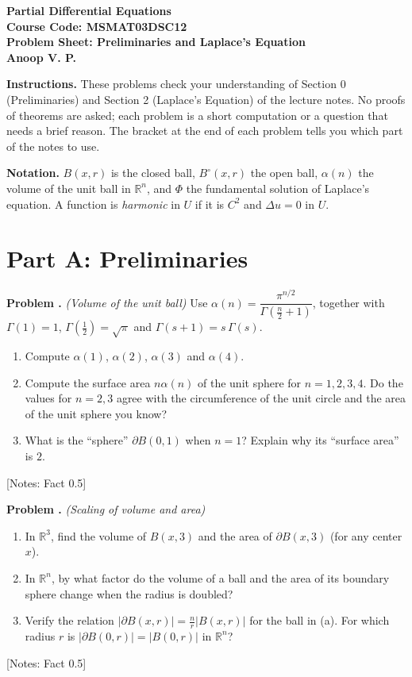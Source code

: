 \documentclass[11pt]{article}
\newcounter{prob}
\newcommand{\prob}[1]{\refstepcounter{prob}\par\medskip\noindent\textbf{Problem \theprob.} \textit{(#1)}\quad}
\newcommand{\notes}[1]{\hfill{\small[Notes: #1]}}
\begin{document}
\begin{center}
\textbf{\Large Partial Differential Equations} \\[0.5em]
\textbf{Course Code: MSMAT03DSC12} \\[0.5em]
\textbf{Problem Sheet: Preliminaries and Laplace's Equation} \\[0.5em]
\textbf{Anoop V. P.}
\end{center}

\noindent\textbf{Instructions.} These problems check your understanding of Section 0 (Preliminaries) and Section 2 (Laplace's Equation) of the lecture notes. No proofs of theorems are asked; each problem is a short computation or a question that needs a brief reason. The bracket at the end of each problem tells you which part of the notes to use.

\smallskip
\noindent\textbf{Notation.} $B(x,r)$ is the closed ball, $B^\circ(x,r)$ the open ball, $\alpha(n)$ the volume of the unit ball in $\mathbb{R}^n$, and $\Phi$ the fundamental solution of Laplace's equation. A function is \emph{harmonic} in $U$ if it is $C^2$ and $\Delta u = 0$ in $U$.

\section*{Part A: Preliminaries}

\prob{Volume of the unit ball}
Use $\alpha(n) = \dfrac{\pi^{n/2}}{\Gamma(\frac n2 + 1)}$, together with $\Gamma(1) = 1$, $\Gamma(\frac12) = \sqrt\pi$ and $\Gamma(s+1) = s\,\Gamma(s)$.
\begin{enumerate}[label=(\alph*)]
    \item Compute $\alpha(1)$, $\alpha(2)$, $\alpha(3)$ and $\alpha(4)$.
    \item Compute the surface area $n\alpha(n)$ of the unit sphere for $n = 1, 2, 3, 4$. Do the values for $n = 2, 3$ agree with the circumference of the unit circle and the area of the unit sphere you know?
    \item What is the ``sphere'' $\partial B(0,1)$ when $n = 1$? Explain why its ``surface area'' is $2$.
\end{enumerate}
\notes{Fact 0.5}

\prob{Scaling of volume and area}
\begin{enumerate}[label=(\alph*)]
    \item In $\mathbb{R}^3$, find the volume of $B(x,3)$ and the area of $\partial B(x,3)$ (for any center $x$).
    \item In $\mathbb{R}^n$, by what factor do the volume of a ball and the area of its boundary sphere change when the radius is doubled?
    \item Verify the relation $|\partial B(x,r)| = \frac nr |B(x,r)|$ for the ball in (a). For which radius $r$ is $|\partial B(0,r)| = |B(0,r)|$ in $\mathbb{R}^n$?
\end{enumerate}
\notes{Fact 0.5}
\end{document}
